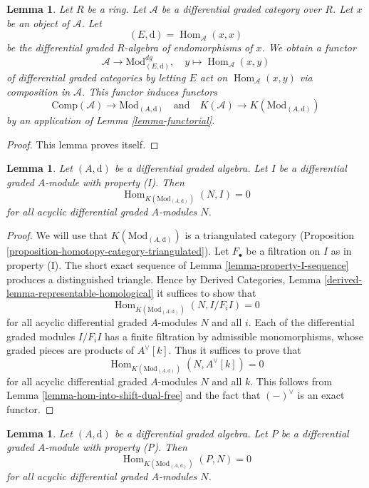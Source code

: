 \documentclass{stacks-project}
\theoremstyle{plain}
\newtheorem{lemma}[subsection]{Lemma}
\theoremstyle{definition}
\theoremstyle{remark}
\numberwithin{equation}{subsection}
\def\Hom{\mathop{\mathrm{Hom}}\nolimits}
\begin{document}
\begin{lemma}
\label{lemma-construction}
Let $R$ be a ring. Let $\mathcal{A}$ be a differential graded category
over $R$. Let $x$ be an object of $\mathcal{A}$. Let
$$
(E, \text{d}) = \Hom_\mathcal{A}(x, x)
$$
be the differential graded $R$-algebra of endomorphisms of $x$.
We obtain a functor
$$
\mathcal{A} \longrightarrow \text{Mod}^{dg}_{(E, \text{d})},\quad
y \longmapsto \Hom_\mathcal{A}(x, y)
$$
of differential graded categories by letting $E$ act on
$\Hom_\mathcal{A}(x, y)$ via composition in $\mathcal{A}$.
This functor induces functors
$$
\text{Comp}(\mathcal{A}) \to \text{Mod}_{(A, \text{d})}
\quad\text{and}\quad
K(\mathcal{A}) \to K(\text{Mod}_{(A, \text{d})})
$$
by an application of Lemma \ref{lemma-functorial}.
\end{lemma}

\begin{proof}
This lemma proves itself.
\end{proof}

\begin{lemma}
\label{lemma-property-I-K-injective}
Let $(A, \text{d})$ be a differential graded algebra.
Let $I$ be a differential graded $A$-module with property (I).
Then
$$
\Hom_{K(\text{Mod}_{(A, \text{d})})}(N, I) = 0
$$
for all acyclic differential graded $A$-modules $N$.
\end{lemma}

\begin{proof}
We will use that $K(\text{Mod}_{(A, \text{d})})$ is a triangulated
category (Proposition \ref{proposition-homotopy-category-triangulated}).
Let $F_\bullet$ be a filtration on $I$ as in property (I).
The short exact sequence of Lemma \ref{lemma-property-I-sequence}
produces a distinguished triangle. Hence by
Derived Categories, Lemma \ref{derived-lemma-representable-homological}
it suffices to show that
$$
\Hom_{K(\text{Mod}_{(A, \text{d})})}(N, I/F_iI) = 0
$$
for all acyclic differential graded $A$-modules $N$ and all $i$.
Each of the differential graded modules $I/F_iI$ has a finite filtration
by admissible monomorphisms, whose graded pieces are
products of $A^\vee[k]$. Thus it suffices to prove that
$$
\Hom_{K(\text{Mod}_{(A, \text{d})})}(N, A^\vee[k]) = 0
$$
for all acyclic differential graded $A$-modules $N$ and all $k$.
This follows from Lemma \ref{lemma-hom-into-shift-dual-free}
and the fact that $(-)^\vee$ is an exact functor.
\end{proof}

\begin{lemma}
\label{lemma-property-P-K-projective}
Let $(A, \text{d})$ be a differential graded algebra.
Let $P$ be a differential graded $A$-module with property (P).
Then
$$
\Hom_{K(\text{Mod}_{(A, \text{d})})}(P, N) = 0
$$
for all acyclic differential graded $A$-modules $N$.
\end{lemma}
\end{document}
